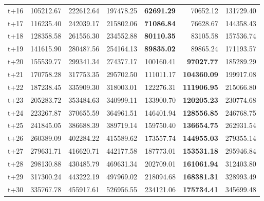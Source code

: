 \begin{table}[H]
\begin{tabular}{lrrrrrr}
t+16  & 105212.67  & 222612.64  & 197478.25  & \textbf{62691.29}  & 70652.12  & 131729.40  \\
t+17  & 116235.40  & 242039.17  & 215802.06  & \textbf{71086.84}  & 76628.67  & 144358.43  \\
t+18  & 128358.58  & 261556.30  & 234552.88  & \textbf{80110.35}  & 83105.58  & 157536.74  \\
t+19  & 141615.90  & 280487.56  & 254164.13  & \textbf{89835.02}  & 89865.24  & 171193.57  \\
t+20  & 155539.77  & 299341.34  & 274377.17  & 100160.41  & \textbf{97027.77}  & 185289.29  \\
t+21  & 170758.28  & 317753.35  & 295702.50  & 111011.17  & \textbf{104360.09}  & 199917.08  \\
t+22  & 187238.45  & 335909.30  & 318003.01  & 122276.31  & \textbf{111906.95}  & 215066.80  \\
t+23  & 205283.72  & 353484.63  & 340999.11  & 133900.70  & \textbf{120205.23}  & 230774.68  \\
t+24  & 223267.87  & 370655.59  & 364961.51  & 146401.94  & \textbf{128556.85}  & 246768.75  \\
t+25  & 241845.05  & 386688.39  & 389719.14  & 159750.40  & \textbf{136654.75}  & 262931.54  \\
t+26  & 260389.09  & 402284.22  & 415589.62  & 173557.74  & \textbf{144955.03}  & 279355.14  \\
t+27  & 279631.71  & 416620.71  & 442177.58  & 187773.01  & \textbf{153531.18}  & 295946.84  \\
t+28  & 298130.88  & 430485.79  & 469631.34  & 202709.01  & \textbf{161061.94}  & 312403.80  \\
t+29  & 317300.24  & 443222.19  & 497969.02  & 218094.68  & \textbf{168381.31}  & 328993.49  \\
t+30  & 335767.78  & 455917.61  & 526956.55  & 234121.06  & \textbf{175734.41}  & 345699.48  \\

\bottomrule
\end{tabular}
\end{table}

